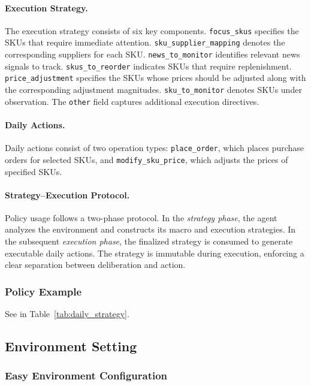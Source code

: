 \paragraph{Execution Strategy.}
The execution strategy consists of six key components. 
\texttt{focus\_skus} specifies the SKUs that require immediate attention.
\texttt{sku\_supplier\_mapping} denotes the corresponding suppliers for each SKU.
\texttt{news\_to\_monitor} identifies relevant news signals to track.
\texttt{skus\_to\_reorder} indicates SKUs that require replenishment.
\texttt{price\_adjustment} specifies the SKUs whose prices should be adjusted along with the corresponding adjustment magnitudes.
\texttt{sku\_to\_monitor} denotes SKUs under observation.
The \texttt{other} field captures additional execution directives.

\paragraph{Daily Actions.}
Daily actions consist of two operation types:
\texttt{place\_order}, which places purchase orders for selected SKUs, and
\texttt{modify\_sku\_price}, which adjusts the prices of specified SKUs.


\paragraph{Strategy--Execution Protocol.}
Policy usage follows a two-phase protocol.
In the \emph{strategy phase}, the agent analyzes the environment and constructs its macro and execution strategies.
In the subsequent \emph{execution phase}, the finalized strategy is consumed to generate executable daily actions.
The strategy is immutable during execution, enforcing a clear separation between deliberation and action.

\subsubsection{Policy Example}

See in Table~\ref{tab:daily_strategy}.

\label{appendix:policy_exp}



\subsection{Environment Setting}
\label{appendix:env_setting}

\subsubsection{Easy Environment Configuration}

